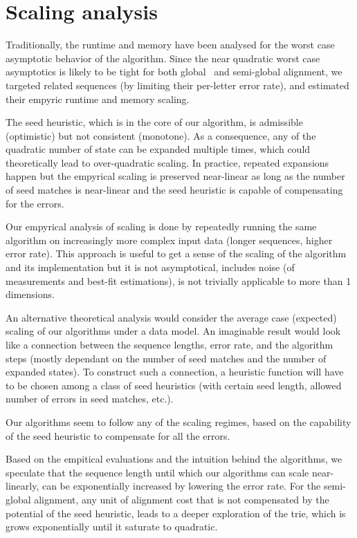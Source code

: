 \section{Scaling analysis}

Traditionally, the runtime and memory have been analysed for the worst case
asymptotic behavior of the algorithm. Since the near quadratic worst case
asymptotics is likely to be tight for both global~\citep{backurs2015edit} and
semi-global alignment, we targeted related sequences (by limiting their
per-letter error rate), and estimated their empyric runtime and memory scaling.

The seed heuristic, which is in the core of our \A algorithm, is admissible
(optimistic) but not consistent (monotone). As a consequence, any of the
quadratic number of state can be expanded multiple times, which could
theoretically lead to over-quadratic scaling. In practice, repeated expansions
happen but the empyrical scaling is preserved near-linear as long as the number
of seed matches is near-linear and the seed heuristic is capable of compensating
for the errors.

Our empyrical analysis of scaling is done by repeatedly running the same
algorithm on increasingly more complex input data (\eg longer sequences, higher
error rate). This approach is useful to get a sense of the scaling of the
algorithm and its implementation but it is not asymptotical, includes noise (of
measurements and best-fit estimations), is not trivially applicable to more than
1 dimensions.

An alternative theoretical analysis would consider the average case (expected)
scaling of our algorithms under a data model. An imaginable result would look
like a connection between the sequence lengths, error rate, and the algorithm
steps (mostly dependant on the number of seed matches and the number of expanded
states). To construct such a connection, a heuristic function will have to be
chosen among a class of seed heuristics (\eg with certain seed length, allowed
number of errors in seed matches, etc.).

Our algorithms seem to follow any of the scaling regimes, based on the
capability of the seed heuristic to compensate for all the errors.

Based on the empitical evaluations and the intuition behind the algorithms, we
speculate that the sequence length until which our algorithms can scale
near-linearly, can be exponentially increased by lowering the error rate. For
the semi-global alignment, any unit of alignment cost that is not compensated by
the potential of the seed heuristic, leads to a deeper exploration of the trie,
which is grows exponentially until it saturate to quadratic.
